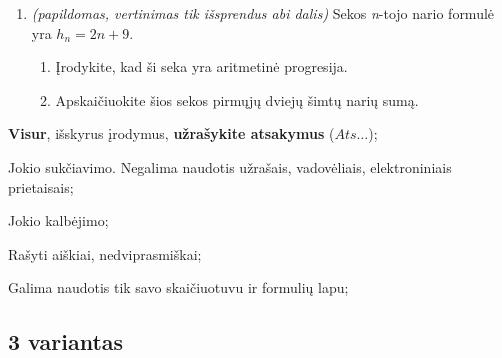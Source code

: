 \documentclass[a4paper]{article}
\begin{document}
\begin{enumerate}
      \item \textit{(papildomas, vertinimas tik išsprendus abi dalis)} Sekos
            \textit{n}-tojo nario formulė yra
            $h_{n} = 2n+9$.
            \begin{enumerate}[label= (\alph*)]
                  \item Įrodykite, kad ši seka yra aritmetinė progresija.
                  \item Apskaičiuokite šios sekos pirmųjų dviejų šimtų narių
                        sumą.
            \end{enumerate}
\end{enumerate}

\begin{small}
      \begin{enumerate*}[label={(\arabic*)}]
            \item \textbf{Visur}, išskyrus įrodymus, \textbf{užrašykite
                  atsakymus} ($Ats\ldots$);
            \item Jokio sukčiavimo. Negalima naudotis užrašais, vadovėliais,
            elektroniniais prietaisais;
            \item Jokio kalbėjimo;
            \item Rašyti aiškiai, nedviprasmiškai;
            \item Galima naudotis tik savo skaičiuotuvu ir formulių lapu;
      \end{enumerate*}
\end{small}

\subsection*{3 variantas}
\end{document}
